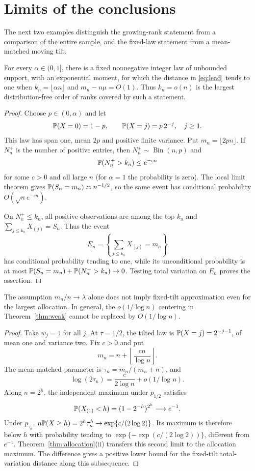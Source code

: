 \section{Limits of the conclusions}\label{sec:limits}\label{sec:sharp}
The next two examples distinguish the growing-rank statement from a comparison of the entire sample, and the fixed-law statement from a mean-matched moving tilt.

\begin{proposition}\label{prop:linear}
For every $\alpha\in(0,1]$, there is a fixed nonnegative integer law of unbounded support, with an exponential moment, for which the distance in \eqref{eq:lead} tends to one when $k_n=\lfloor\alpha n\rfloor$ and $m_n-n\mu=O(1)$. Thus $k_n=o(n)$ is the largest distribution-free order of ranks covered by such a statement.
\end{proposition}
\begin{proof}
Choose $p\in(0,\alpha)$ and let
\[
 \mathbb P(X=0)=1-p,\qquad \mathbb P(X=j)=p\,2^{-j},\quad j\ge1.
\]
This law has span one, mean $2p$ and positive finite variance. Put $m_n=\lfloor2pn\rfloor$. If $N_n^+$ is the number of positive entries, then $N_n^+\sim\operatorname{Bin}(n,p)$ and
\[
 \mathbb P(N_n^+>k_n)\le e^{-cn}
\]
for some $c>0$ and all large $n$ (for $\alpha=1$ the probability is zero). The local limit theorem gives $\mathbb P(S_n=m_n)\asymp n^{-1/2}$, so the same event has conditional probability $O(\sqrt n e^{-cn})$.

On $N_n^+\le k_n$, all positive observations are among the top $k_n$ and
$\sum_{j\le k_n}X_{(j)}=S_n$. Thus the event
\[
 E_n=\left\{\sum_{j\le k_n}X_{(j)}=m_n\right\}
\]
has conditional probability tending to one, while its unconditional probability is at most $\mathbb P(S_n=m_n)+\mathbb P(N_n^+>k_n)\to0$. Testing total variation on $E_n$ proves the assertion.
\end{proof}

\begin{proposition}\label{prop:log}
The assumption $m_n/n\to\lambda$ alone does not imply fixed-tilt approximation even for the largest allocation. In general, the $o(1/\log n)$ centering in Theorem~\ref{thm:weak} cannot be replaced by $O(1/\log n)$.
\end{proposition}
\begin{proof}
Take $w_j=1$ for all $j$. At $\tau=1/2$, the tilted law is
$\mathbb P(X=j)=2^{-j-1}$, of mean one and variance two. Fix $c>0$ and put
\[
 m_n=n+\left\lfloor\frac{cn}{\log n}\right\rfloor.
\]
The mean-matched parameter is $\tau_n=m_n/(m_n+n)$, and
\[
 \log(2\tau_n)=\frac{c}{2\log n}+o(1/\log n).
\]
Along $n=2^h$, the independent maximum under $p_{1/2}$ satisfies
\[
 \mathbb P(X_{(1)}<h)=(1-2^{-h})^{2^h}\longrightarrow e^{-1}.
\]
Under $p_{\tau_n}$, $n\mathbb P(X\ge h)=2^h\tau_n^h\to\exp\{c/(2\log2)\}$. Its maximum is therefore below $h$ with probability tending to
$\exp\{-\exp(c/(2\log2))\}$, different from $e^{-1}$. Theorem~\ref{thm:allocation}(ii) transfers this second limit to the allocation maximum. The difference gives a positive lower bound for the fixed-tilt total-variation distance along this subsequence.
\end{proof}

